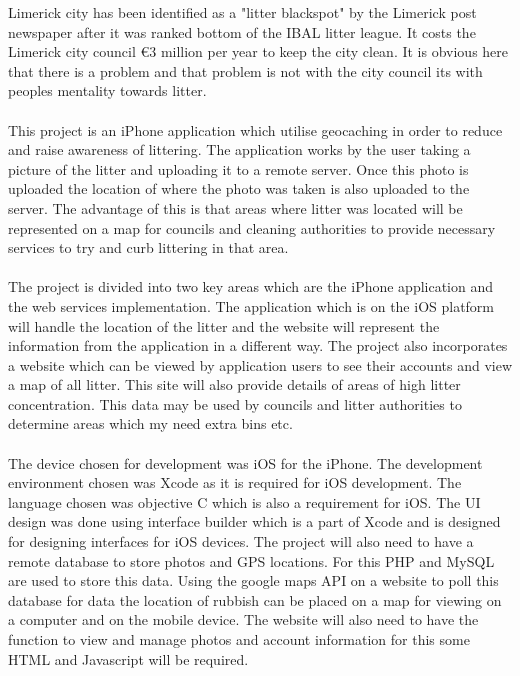 \documentclass{article}
\begin{document}
Limerick city has been identified as a "litter blackspot" by the Limerick post newspaper after it was ranked bottom of the IBAL litter league.
It costs the Limerick city council €3 million per year to keep the city clean. It is obvious here that there is a problem and that problem is not with the city council its with peoples mentality towards litter.  

\paragraph{}
\label{par:First Paragraph}

This project is an iPhone application which utilise geocaching in order to reduce and raise awareness of littering. The application works by the user taking a picture of the litter and uploading it to a remote server. Once this photo is uploaded the location of where the photo was taken is also uploaded to the server. The advantage of this is that areas where litter was located will be represented on a map for councils and cleaning authorities to provide necessary services to try and curb littering in that area. 

\paragraph{}
\label{par:Second Paragraph}

The project is divided into two key areas which are the iPhone application and the web services implementation. The application which is on the iOS platform will handle the location of the litter and the website will represent the information from the application in a different way.
The project also incorporates a website which can be viewed by application users to see their accounts and view a map of all litter. This site will also provide details of areas of high litter concentration. This data may be used by councils and litter authorities to determine areas which my need extra bins etc.

\paragraph{}
\label{par:Third Paragraph}

The device chosen for development was iOS for the iPhone. The development environment chosen was Xcode as it is required for iOS development. The language chosen was objective C which is also a requirement for iOS. 
The UI design was done using interface builder which is a part of Xcode and is designed for designing interfaces for iOS devices.
The project will also need to have a remote database to store photos and GPS locations. For this PHP and MySQL are used to store this data. Using the google maps API on a website to poll this database for data the location of rubbish can be placed on a map for viewing on a computer and on the mobile device.
The website will also need to have the function to view and manage photos and account information for this some HTML and Javascript will be required. 
\end{document}
